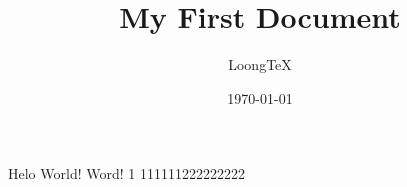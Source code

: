 \documentclass{article}
\title{My First Document}
\author{LoongTeX}
\date{\today}
\begin{document}
	\maketitle
	Helo World! Word! 1  111111222222222
\end{document}
